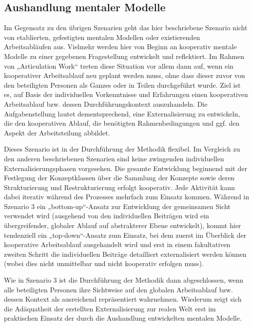 
\subsection{Aushandlung mentaler Modelle} %
\label{sub:aushandlung_individueller_mentaler_modelle}

Im Gegensatz zu den übrigen Szenarien geht das hier beschriebene Szenario nicht von etablierten, gefestigten mentalen Modellen oder existierenden Arbeitsabläufen aus. Vielmehr werden hier von Beginn an kooperativ mentale Modelle zu einer gegebenen Fragestellung entwickelt und reflektiert. Im Rahmen von „Articulation Work“ treten diese Situation vor allem dann auf, wenn ein kooperativer Arbeitsablauf neu geplant werden muss, ohne dass dieser zuvor von den beteiligten Personen als Ganzes oder in Teilen durchgeführt wurde. Ziel ist es, auf Basis der individuellen Vorkenntnisse und Erfahrungen einen kooperativen Arbeitsablauf bzw. dessen Durchführungskontext auszuhandeln. Die Aufgabenstellung lautet dementsprechend, eine Externalisierung zu entwickeln, die den kooperativen Ablauf, die benötigten Rahmenbedingungen und ggf. den Aspekt der Arbeitsteilung abbildet. 

Dieses Szenario ist in der Durchführung der Methodik flexibel. Im Vergleich zu den anderen beschriebenen Szenarien sind keine zwingenden individuellen Externalisierungsphasen vorgesehen. Die gesamte Entwicklung beginnend mit der Festlegung der Konzeptklassen über die Sammlung der Konzepte sowie deren Strukturierung und Restrukturierung erfolgt kooperativ. Jede Aktivität kann dabei iterativ während des Prozesses mehrfach zum Einsatz kommen. Während in Szenario 3 ein „bottom-up“-Ansatz zur Entwicklung der gemeinsamen Sicht verwendet wird (ausgehend von den individuellen Beiträgen wird ein übergreifender, globaler Ablauf auf abstrakterer Ebene entwickelt), kommt hier tendenziell ein „top-down“-Ansatz zum Einsatz, bei dem zuerst im Überblick der kooperative Arbeitsablauf ausgehandelt wird und erst in einem fakultativen zweiten Schritt die individuellen Beiträge detailliert externalisiert werden können (wobei dies nicht unmittelbar und nicht kooperativ erfolgen muss).

Wie in Szenario 3 ist die Durchführung der Methodik dann abgeschlossen, wenn alle beteiligten Personen ihre Sichtweise auf den globalen Arbeitsablauf bzw. dessen Kontext als ausreichend repräsentiert wahrnehmen. Wiederum zeigt sich die Adäquatheit der erstellten Externalisierung zur realen Welt erst im praktischen Einsatz der durch die Aushandlung entwickelten mentalen Modelle. 

